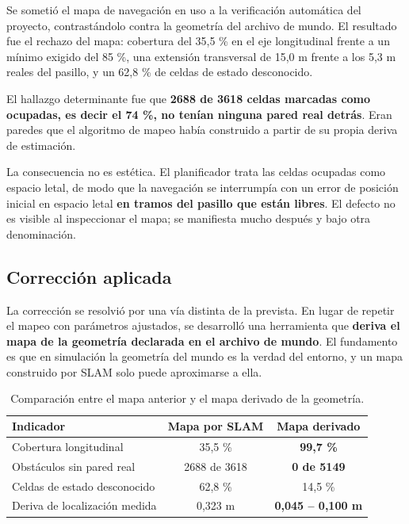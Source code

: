 \documentclass[12pt,letterpaper]{article}
\begin{document}
Se sometió el mapa de navegación en uso a la verificación automática del proyecto, contrastándolo contra la geometría del archivo de mundo. El resultado fue el rechazo del mapa: cobertura del 35,5 \% en el eje longitudinal frente a un mínimo exigido del 85 \%, una extensión transversal de 15,0 m frente a los 5,3 m reales del pasillo, y un 62,8 \% de celdas de estado desconocido.

El hallazgo determinante fue que \textbf{2688 de 3618 celdas marcadas como ocupadas, es decir el 74 \%, no tenían ninguna pared real detrás}. Eran paredes que el algoritmo de mapeo había construido a partir de su propia deriva de estimación.

La consecuencia no es estética. El planificador trata las celdas ocupadas como espacio letal, de modo que la navegación se interrumpía con un error de posición inicial en espacio letal \textbf{en tramos del pasillo que están libres}. El defecto no es visible al inspeccionar el mapa; se manifiesta mucho después y bajo otra denominación.

\subsection{Corrección aplicada}

La corrección se resolvió por una vía distinta de la prevista. En lugar de repetir el mapeo con parámetros ajustados, se desarrolló una herramienta que \textbf{deriva el mapa de la geometría declarada en el archivo de mundo}. El fundamento es que en simulación la geometría del mundo es la verdad del entorno, y un mapa construido por SLAM solo puede aproximarse a ella.

\begin{table}[H]
    \centering
    \small
    \caption{Comparación entre el mapa anterior y el mapa derivado de la geometría.}
    \label{tab:mapas}
    \begin{tabular}{@{}lcc@{}}
        \toprule
        \textbf{Indicador} & \textbf{Mapa por SLAM} & \textbf{Mapa derivado} \\ \midrule
        Cobertura longitudinal & 35,5 \% & \textbf{99,7 \%} \\
        Obstáculos sin pared real & 2688 de 3618 & \textbf{0 de 5149} \\
        Celdas de estado desconocido & 62,8 \% & 14,5 \% \\
        Deriva de localización medida & 0,323 m & \textbf{0,045 -- 0,100 m} \\ \bottomrule
    \end{tabular}
\end{table}
\end{document}
